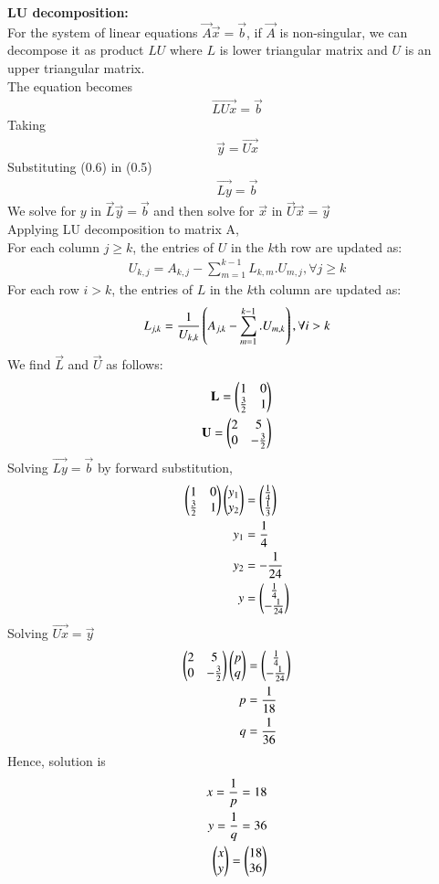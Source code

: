 \documentclass[journal]{IEEEtran}
\begin{document}
\textbf{LU decomposition:}\\
For the system of linear equations $\vec{A}\vec{x}=\vec{b}$, if $\vec{A}$ is non-singular, we can decompose it as product $LU$ where $L$ is lower triangular matrix and $U$ is an upper triangular matrix.\\
The equation becomes 
\begin{align}
    \vec{LUx}=\vec{b} 
\end{align}
Taking 
\begin{align}
    \vec{y}=\vec{Ux}
\end{align}
Substituting (0.6) in (0.5)
\begin{align}
    \vec{Ly}=\vec{b}
\end{align}
We solve for $y$ in $\vec{L}\vec{y}=\vec{b}$ and then solve for $\vec{x}$ in $\vec{U}\vec{x}=\vec{y}$\\
Applying LU decomposition to matrix A, \\
For each column $j \geq k$, the entries of $U$ in the $k$th row are updated as:
\begin{align}
    U_{k,j} = A_{k,j} - \sum_{m=1}^{k-1} L_{k,m}.U_{m,j},   \forall{j \geq k}
\end{align}
For each row $i > k$, the entries of $L$ in the $k$th column are updated as:
\begin{align}
    L_{j,k} = \frac{1}{U_{k,k}}\left(A_{j,k} - \sum_{m=1}^{k-1}.U_{m,k}\right), \forall{i>k}
\end{align}
We find $\vec{L}$ and $\vec{U}$ as follows:
\begin{align}
    \mathbf{L}=\begin{pmatrix}1 & 0\\ \frac{3}{2} & 1 \end{pmatrix} \\
    \mathbf{U}=\begin{pmatrix}2 & 5\\ 0 & -\frac{3}{2} \end{pmatrix}
\end{align}
Solving $\vec{Ly}=\vec{b}$ by forward substitution,
\begin{align}
    \begin{pmatrix}1 & 0 \\ \frac{3}{2}&1\end{pmatrix}\begin{pmatrix}y_1\\y_2\end{pmatrix}&=\begin{pmatrix} \frac{1}{4} \\\frac{1}{3}\end{pmatrix}\\
    y_1&=\frac{1}{4}\\
    y_2&=-\frac{1}{24}\\
    y&=\begin{pmatrix}\frac{1}{4}\\ -\frac{1}{24}\end{pmatrix}
\end{align}
Solving $\vec{Ux}=\vec{y}$
\begin{align}
    \begin{pmatrix}2 & 5\\0 & -\frac{3}{2}\end{pmatrix}\begin{pmatrix}p\\q\end{pmatrix}&=\begin{pmatrix}\frac{1}{4}\\-\frac{1}{24}\end{pmatrix}\\
    p&=\frac{1}{18}\\
    q&=\frac{1}{36}
\end{align}
Hence, solution is
\begin{align}
    x=\frac{1}{p}=18\\
    y=\frac{1}{q}=36\\
    \begin{pmatrix}x\\y\end{pmatrix}=\begin{pmatrix}18\\36\end{pmatrix}
\end{align}
\end{document}
